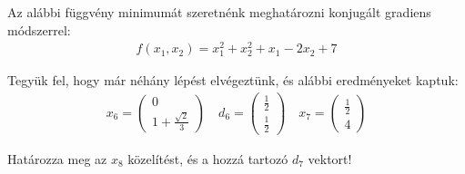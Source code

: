\feladatszam Az alábbi függvény minimumát szeretnénk meghatározni konjugált gradiens módszerrel:
\begin{align*}
f(x_1,x_2)=x_1^2+x_2^2+x_1-2x_2+7
\end{align*}

Tegyük fel, hogy már néhány lépést elvégeztünk, és alábbi eredményeket kaptuk:
\begin{align*}
x_6=\left(\begin{array}{c}0\\1+\frac{\sqrt{2}}{3}\end{array}\right) \quad 
d_6=\left(\begin{array}{c}\frac{1}{2}\\\frac{1}{2}\end{array}\right) \quad
x_7=\left(\begin{array}{c}\frac{1}{2}\\4\end{array}\right)
\end{align*}

Határozza meg az $x_8$ közelítést, és a hozzá tartozó $d_7$ vektort!


